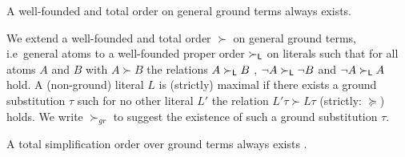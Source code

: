 \begin{lemma}A well-founded and total order on general ground terms always exists.\end{lemma}

	\begin{definition}\label{def:orders-on-literals}
		We extend a well-founded and total order \(\succ\) on general ground terms,
		i.e~general atoms to a well-founded proper order \(\succ_{\mathsf{L}}\)
		on literals such that for all atoms \(A\) and \(B\) with \(A\succ B\)
		the relations \(A\succ_{\mathsf{L}} B\) ,
		\(\lnot A\succ_{\mathsf{L}}\lnot B\) and
		\(\lnot A\succ_{\mathsf{L}} A\) hold.
		A (non-ground) literal \(L\) is {\myem (strictly) maximal} if there exists a ground substitution \(\tau\)
		such for no other literal \(L'\) the relation \(L'\tau\succ L\tau\) (strictly: \(\succcurlyeq\)) holds.
		We write \(\succ_{gr}\) to suggest the existence of such a ground substitution \(\tau\).
	\end{definition}
%

%
\begin{lemma}
    A total simplification order
    over ground terms always exists \cite{NR2001}.
\end{lemma}


